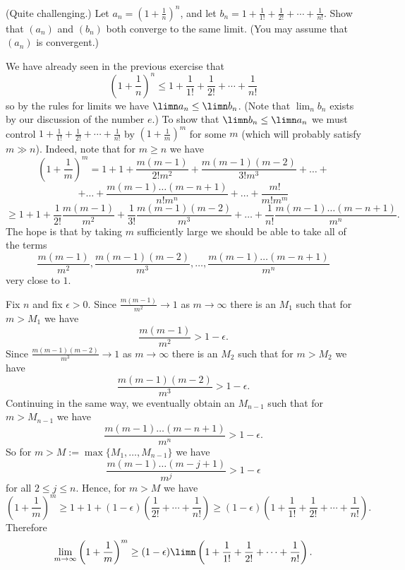 \documentclass[11pt,dvipsnames]{book}
\numberwithin{figure}{section} %
\numberwithin{table}{section} %
\begin{document}
\begin{exercise}(Quite challenging.)
Let $a_n = \left(1 + \frac{1}{n}\right)^n$, and let $b_n = 1 + \frac{1}{1!} + \frac{1}{2!} + \cdots + \frac{1}{n!}$. Show that $(a_n)$ and $(b_n)$ both converge to the same limit. (You may assume that $(a_n)$ is convergent.)

\begin{solution}
We have already seen in the previous exercise that
\[ \left(1 + \frac{1}{n}\right)^n \leq 1 + \frac{1}{1!} + \frac{1}{2!} + \cdots + \frac{1}{n!}\]
so by the rules for limits we have
$\limn a_n \leq \limn b_n$. (Note that $\lim_n b_n$ exists by our discussion of the number $e$.) To show that $\limn b_n \leq \limn a_n$ we must control $1 + \frac{1}{1!} + \frac{1}{2!} + \cdots + \frac{1}{n!}$ by $\left(1 + \frac{1}{m}\right)^m$ for some $m$ (which will probably satisfy $m \gg n$). Indeed, note that for $m \geq n$ we have
\[ \left(1 + \frac{1}{m}\right)^m =
1 + 1 + \frac{m(m-1)}{2!m^2} + \frac{m(m-1)(m-2)}{3!m^3} + \dots
+\]
\[+ \dots
+ \frac{m(m-1) \dots (m-n+1)}{n! m^n} + \dots + \frac{m!}{m!m^m}
\]
\[ \geq 1 + 1 + \frac{1}{2!}\frac{m(m-1)}{m^2} + \frac{1}{3!}\frac{m(m-1)(m-2)}{m^3} + \dots
+ \frac{1}{n!}\frac{m(m-1) \dots (m-n+1)}{m^n}.
\]
The hope is that by taking $m$ sufficiently large we should be able to take all of the terms
\[
\frac{m(m-1)}{m^2}, \frac{m(m-1)(m-2)}{m^3}, \dots, \frac{m(m-1) \dots (m-n+1)}{m^n}
\]
very close to $1$.

Fix $n$ and fix $\epsilon>0$. Since
$\frac{m(m-1)}{m^2} \to 1$ as $m \to \infty$ there is an $M_1$ such that
for $m > M_1$ we have
\[ \frac{m(m-1)}{m^2} > 1- \epsilon.\]
Since
$ \frac{m(m-1)(m-2)}{m^3}\to 1$ as $m \to \infty$ there is an $M_2$ such that
for $m > M_2$ we have
\[ \frac{m(m-1)(m-2)}{m^3} > 1- \epsilon.\]
Continuing in the same way, we eventually obtain an $M_{n-1}$ such that for $m > M_{n-1}$ we have
\[\frac{m(m-1) \dots (m-n+1)}{m^n} > 1-\epsilon. \]
So for $m > M :=\max\{M_1, \dots, M_{n-1}\}$ we have
\[ \frac{m(m-1) \dots (m-j+1)}{m^j}
>1-\epsilon\]
for all $2\leq j \leq n$.
Hence, for $m >M$ we have
\[ \left(1 + \frac{1}{m}\right)^m \geq 1 + 1 +(1 - \epsilon)\left(
\frac{1}{2!} + \cdots + \frac{1}{n!}\right) \geq (1 - \epsilon)\left(1 + \frac{1}{1!} +
\frac{1}{2!} + \cdots + \frac{1}{n!}\right).\]
Therefore
\[ \lim_{m \to \infty} \left(1 + \frac{1}{m}\right)^m \geq (1 - \epsilon) \limn \left(1 + \frac{1}{1!} +
\frac{1}{2!} + \cdots + \frac{1}{n!} \right).
\]

\end{solution}
\end{exercise}
\end{document}
